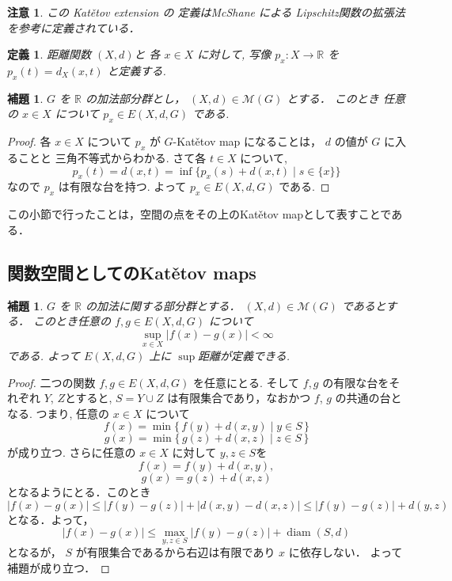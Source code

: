 \documentclass[leqno, 12pt]{jsarticle}
\newtheorem{lem}[thm]{補題}
\newtheorem{df}[thm]{定義}
\newtheorem*{rmk}{注意}
\newcommand{\rr}{\mathbb{R}}
\DeclareMathOperator{\di}{diam}
\begin{document}
\begin{rmk}
この
Kat\v{e}tov extension
の
定義はMcShane 
\cite{McShane}による
Lipschitz関数の拡張法を参考に定義されている．
\end{rmk}



\begin{df}\label{df:katetov:pt}
距離関数
$(X, d)$と
各
$x\in X$
に対して, 
写像
$p_{x}\colon X\to \rr$
を
$p_{x}(t)=d_{X}(x, t)$
と定義する.
\end{df}



\begin{lem}\label{lem:katetov:embed}
$G$
を
$\rr$
の加法部分群とし，
$(X, d)\in \mathscr{M}(G)$
とする．
このとき
任意の
$x\in X$
について
$p_{x}\in E(X, d, G)$
である.
\end{lem}
\begin{proof}
各
$x\in X$
について
$p_{x}$
が
$G$-Kat\v{e}tov map
になることは，
$d$
の値が
$G$
に入ることと
三角不等式からわかる.
さて各
$t\in X$
について,
\[
p_{x}(t)=d(x, t)=\inf\{p_{x}(s)+d(x, t)\mid s\in \{x\}\}
\]
なので
$p_{x}$
は有限な台を持つ. 
よって
$p_{x}\in E(X, d, G)$
である.
\end{proof}
この小節で行ったことは，空間の点をその上のKat\v{e}tov
mapとして表すことである．

\subsection{関数空間としてのKat\v{e}tov maps}

\begin{lem}\label{lem:katetov:bounded}
$G$
を
$\rr$
の加法に関する部分群とする．
$(X, d)\in \mathscr{M}(G)$
であるとする．
このとき任意の
$f, g\in E(X, d, G)$
について
\[
\sup_{x\in X}|f(x)-g(x)|<\infty
\]
である.
よって
$E(X, d, G)$
上に
$\sup$距離が定義できる.
\end{lem}
\begin{proof}
二つの関数
$f, g\in E(X, d, G)$
を任意にとる. 
そして
$f, g$
の有限な台をそれぞれ
$Y$,  $Z$とすると, 
$S=Y\cup Z$
は有限集合であり，なおかつ
$f$, $g$
の共通の台となる. 
つまり,
任意の
$x\in X$
について
\[
f(x)=\min\{\, f(y)+d(x, y)\mid y\in S\, \}
\]
\[
g(x)=\min\{\, g(z)+d(x, z)\mid z\in S\, \}
\]
が成り立つ. 
さらに任意の
$x\in X$
に対して
$y, z\in S$を
\[
f(x)=f(y)+d(x, y),
\]
\[ 
g(x)=g(z)+d(x, z)
\]
となるようにとる．このとき
\[
|f(x)-g(x)|\le |f(y)-g(z)|+|d(x, y)-d(x, z)|\le |f(y)-g(z)|+d(y, z)
\]
となる．よって，
\[
|f(x)-g(x)|\le \max_{y, z\in S}|f(y)-g(z)|+\di(S, d)
\]
となるが，
$S$
が有限集合であるから右辺は有限であり
$x$
に依存しない．
よって補題が成り立つ．
\end{proof}
\end{document}
